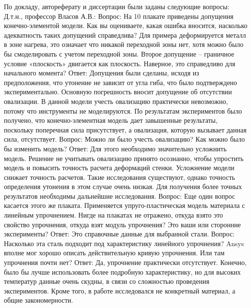 По докладу, автореферату и диссертации были заданы следующие вопросы:
Д.т.н., профессор Власов А.В.:
Вопрос: На 10 плакате приведены допущения конечно-элементой модели. Как вы оцениваете, какая ошибка вносится, насколько адекватность таких допущений справедлива? Для примера деформируется металл в зоне нагрева, это означает что никакой переходной зоны нет, хотя можно было бы смоделировать с учетом переходной зоны. Второе допущение – граничное условие «плоскость» двигается как плоскость. Наверное, это справедливо для начального момента? 
Ответ: Допущения были сделаны, исходя из предположения, что утонение не зависит от угла гиба, что было подтверждено экспериментально. Основную погрешность вносит допущение об отсутствии овализации. В данной модели учесть овализацию практически невозможно, потому что инструменты не моделируются. По результатам экспериментов было получено, что конечно-элементная модель дает завышенные результаты, поскольку поперечная сила присутствует, а овализация, которую вызывает данная сила, отсутствует.
Вопрос: Можно ли было учесть овализацию? Как можно было бы изменить модель?
Ответ: Для этого необходимо значительно усложнить модель. Решение не учитывать овализацию принято осознанно, чтобы упростить модель и повысить точность расчета деформаций стенки. Усложнение модели снижает точность расчетов. Такие исследования существуют, однако точность определения утонения в этом случае очень низкая. Для получения более точных результатов необходимы дальнейшие исследования.
Вопрос: Еще один вопрос касается этого же плаката. Применяется упруго-пластическая модель материала с линейным упрочнением. Нигде на плакатах не отражено, откуда взято это свойство упрочнения, откуда взят модуль упрочнения? Это ваши или сторонние эксперименты?
Ответ: Это справочные данные для выбранной стали.
Вопрос: Насколько эта сталь подходит под характеристику линейного упрочнения? Ansys вполне мог хорошо описать действительную кривую упрочнения. Или там упрочнения почти нет?
Ответ: Да, упрочнение практически отсутствует. Конечно, было бы лучше использовать более подробную характеристику, но для высоких температур данные очень скудны, в связи со сложностью проведения экспериментов. Кроме того, в работе исследовался не конкретный материал, а общие закономерности.


